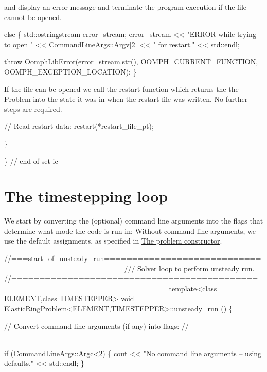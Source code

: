 and display an error message and terminate the program execution if the file cannot be opened.


\begin{DoxyCodeInclude}
   \textcolor{keywordflow}{else}
    \{
     std::ostringstream error\_stream;
     error\_stream << \textcolor{stringliteral}{"ERROR while trying to open "} 
                  << CommandLineArgs::Argv[2] 
                  << \textcolor{stringliteral}{" for restart."} << std::endl;

     \textcolor{keywordflow}{throw} OomphLibError(error\_stream.str(),
                         OOMPH\_CURRENT\_FUNCTION,
                         OOMPH\_EXCEPTION\_LOCATION);
    \}

\end{DoxyCodeInclude}


If the file can be opened we call the restart function which returns the the {\ttfamily Problem} into the state it was in when the restart file was written. No further steps are required.


\begin{DoxyCodeInclude}

   \textcolor{comment}{// Read restart data:}
   restart(*restart\_file\_pt);

  \}

\} \textcolor{comment}{// end of set ic}

\end{DoxyCodeInclude}




 

\hypertarget{index_unsteady_run}{}\section{The timestepping loop}\label{index_unsteady_run}
We start by converting the (optional) command line arguments into the flags that determine what mode the code is run in\+: Without command line arguments, we use the default assignments, as specified in \hyperlink{index_constructor}{The problem constructor}.


\begin{DoxyCodeInclude}
\textcolor{comment}{//===start\_of\_unsteady\_run=================================================}
\textcolor{comment}{/// Solver loop to perform unsteady run.}
\textcolor{comment}{}\textcolor{comment}{//=========================================================================}
\textcolor{keyword}{template}<\textcolor{keyword}{class} ELEMENT,\textcolor{keyword}{class} TIMESTEPPER>
\textcolor{keywordtype}{void} \hyperlink{classElasticRingProblem_acd30c4363ffedbaadc1523aa8b85523b}{ElasticRingProblem<ELEMENT,TIMESTEPPER>::unsteady\_run}
      ()
\{
 
 \textcolor{comment}{// Convert command line arguments (if any) into flags:}
 \textcolor{comment}{//----------------------------------------------------}

 \textcolor{keywordflow}{if} (CommandLineArgs::Argc<2)
  \{
   cout << \textcolor{stringliteral}{"No command line arguments -- using defaults."} 
        << std::endl;
  \}

\end{DoxyCodeInclude}


